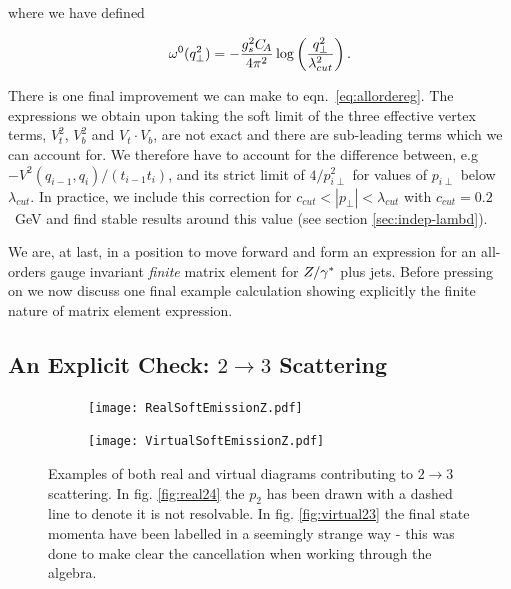 		where we have defined

		\begin{align}
		  \label{eq:omega0}
		  \omega^0(q_{\perp}^2) = - \frac{g_s^2 C_{\!A}}{4\pi^2} \log\left( \frac{q_\perp^2}{\lambda_{cut}^2}\right).
		\end{align}

		There is one final improvement we can make to eqn.~\eqref{eq:allordereg}.  The expressions
		we obtain upon taking the soft limit of the three effective vertex terms, $V^2_t$, $V^2_b$
		and $V_t\cdot V_b$, are not exact and there are sub-leading terms which we can account for.
		We therefore have to account for the difference between, e.g $-V^2(q_{i-1},q_{i})/(t_{i-1} t_i)$,
		and its strict limit of $4/p_{i\perp}^2$ for values of $p_{i\perp}$ below $\lambda_{cut}$.  In
		practice, we include this correction for $c_{cut}<|p_\perp|<\lambda_{cut}$ with
		$c_{cut} = 0.2$~GeV and find stable results around this value (see section \ref{sec:indep-lambd}).

		We are, at last, in a position to move forward and form an expression for an all-orders
		gauge invariant \emph{finite} matrix element for $Z/\gamma^*$ plus jets.  Before pressing on
		we now discuss one final example calculation showing explicitly the finite nature of
		matrix element expression.

	\subsection{An Explicit Check: $2\rightarrow3$ Scattering}

		\begin{figure}[bthp]
			\centering
			\begin{subfigure}[b]{0.5\textwidth}
				\texttt{[image: RealSoftEmissionZ.pdf]}
				\caption{}
				\label{fig:real24}
			\end{subfigure}

			\begin{subfigure}[b]{0.5\textwidth}
				\centering
				\texttt{[image: VirtualSoftEmissionZ.pdf]}
				\caption{}
				\label{fig:virtual23}
			\end{subfigure}

			\caption{Examples of both real and virtual diagrams contributing to
			$2\rightarrow3$ scattering. In fig. \eqref{fig:real24} the $p_2$ has been
			drawn with a dashed line to denote it is not resolvable.  In fig.
			\eqref{fig:virtual23} the final state momenta have been labelled in a
			seemingly strange way - this was done to make clear the cancellation
			when working through the algebra.}
			\label{fig:2to}
		\end{figure}

